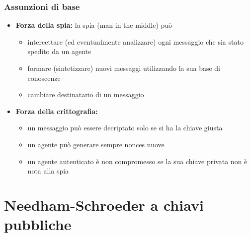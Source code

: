 \subsubsection{Assunzioni di base}
\begin{itemize}
    \item \textbf{Forza della spia:} la spia (man in the middle) può
    \begin{itemize}
        \item intercettare (ed eventualmente analizzare) ogni messaggio che sia stato spedito da un agente
        \item formare (sintetizzare) nuovi messaggi utilizzando la sua base di conoscenze
        \item cambiare destinatario di un messaggio
    \end{itemize}
    \item \textbf{Forza della crittografia:} 
    \begin{itemize}
        \item un messaggio può essere decriptato solo se si ha la chiave giusta
        \item un agente può generare sempre nonces nuove
        \item un agente autenticato è non compromesso se la sua chiave privata non è nota alla spia
    \end{itemize}
\end{itemize}

\section{Needham-Schroeder a chiavi pubbliche}
